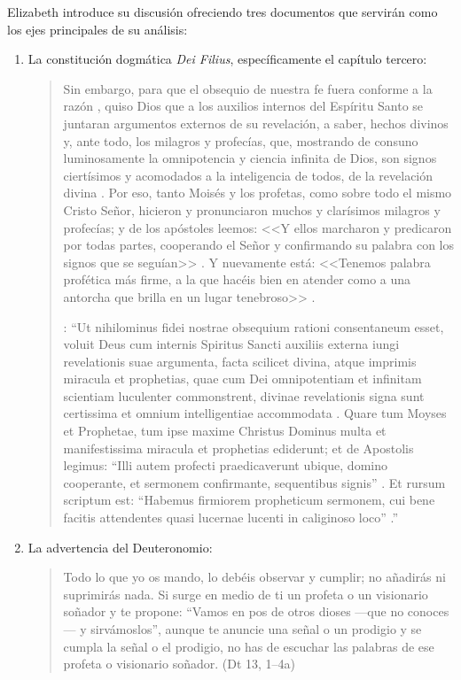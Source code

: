 Elizabeth introduce su discusión ofreciendo tres documentos que servirán como los ejes principales de su análisis:
\begin{enumerate}
\item La constitución dogmática \emph{Dei Filius}, específicamente el capítulo tercero: \blockquote[{\cite[\S\,3009]{vati1870df}}: \enquote{Ut nihilominus fidei nostrae obsequium rationi consentaneum  esset, voluit Deus cum internis Spiritus Sancti auxiliis externa iungi revelationis suae argumenta, facta scilicet divina, atque imprimis miracula et prophetias, quae cum Dei omnipotentiam et infinitam scientiam luculenter commonstrent, divinae revelationis signa sunt certissima et omnium intelligentiae accommodata . Quare tum Moyses et Prophetae, tum ipse maxime Christus Dominus multa et manifestissima miracula et prophetias ediderunt; et de Apostolis legimus: ``Illi autem profecti praedicaverunt ubique, domino cooperante, et sermonem confirmante, sequentibus signis'' . Et rursum scriptum est: ``Habemus firmiorem propheticum sermonem, cui bene facitis attendentes quasi lucernae lucenti in caliginoso loco'' .}]{Sin embargo, para que el obsequio de nuestra fe fuera conforme a la razón , quiso Dios que a los auxilios internos del Espíritu Santo se juntaran argumentos externos de su revelación, a saber, hechos divinos y, ante todo, los milagros y profecías, que, mostrando de consuno luminosamente la omnipotencia y ciencia infinita de Dios, son signos ciertísimos y acomodados a la inteligencia de todos, de la revelación divina . Por eso, tanto Moisés y los profetas, como sobre todo el mismo Cristo Señor, hicieron y pronunciaron muchos y clarísimos milagros y profecías; y de los apóstoles leemos: <<Y ellos marcharon y predicaron por todas partes, cooperando el Señor y confirmando su palabra con los signos que se seguían>> . Y nuevamente está: <<Tenemos palabra profética más firme, a la que hacéis bien en atender como a una antorcha que brilla en un lugar tenebroso>> .}
\item La advertencia del Deuteronomio: \blockquote{Todo lo que yo os mando, lo debéis observar y cumplir; no añadirás ni suprimirás nada. Si surge en medio de ti un profeta o un visionario soñador y te propone: \enquote{Vamos en pos de otros dioses ---que no conoces--- y sirvámoslos}, aunque te anuncie una señal o un prodigio y se cumpla la señal o el prodigio, no has de escuchar las palabras de ese profeta o visionario soñador. (Dt 13, 1--4a)}

\end{enumerate}
